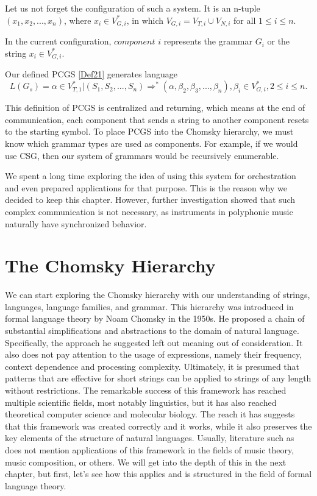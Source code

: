 \begin{definition}
\label{Def23}
Let us not forget the configuration of such a system. It is an n-tuple $(x_1, x_2, ..., x_n)$, where $x_i \in V^*_{G,i}$, in which $V_{G,i} = V_{T,i} \cup V_{N,i}$ for all $1 \leq i \leq n$.
\end{definition}

In the current configuration, $component$ $i$ represents the grammar $G_i$ or the string $x_i \in V^*_{G, i}$.

\begin{definition}
\label{Def24}
Our defined PCGS \ref{Def21} generates language $$L(G_s) = {\alpha \in V^*_{T, 1} | (S_1, S_2, ..., S_n) \Rightarrow^* (\alpha, \beta_2, \beta_3, ..., \beta_n), \beta_i \in V^*_{G,i}, 2 \leq i \leq n}.$$ 
\end{definition}

This definition of PCGS is centralized and returning, which means at the end of communication, each component that sends a string to another component resets to the starting symbol. To place PCGS into the Chomsky hierarchy, we must know which grammar types are used as components. For example, if we would use CSG, then our system of grammars would be recursively enumerable.

We spent a long time exploring the idea of using this system for orchestration and even prepared applications for that purpose. This is the reason why we decided to keep this chapter. However, further investigation showed that such complex communication is not necessary, as instruments in polyphonic music naturally have synchronized behavior.


\section{The Chomsky Hierarchy}
\label{sec:chomhierarchy}
We can start exploring the Chomsky hierarchy with our understanding of strings, languages, language families, and grammar. This hierarchy was introduced in formal language theory by Noam Chomsky in the 1950s. He proposed a chain of substantial simplifications and abstractions to the domain of natural language. Specifically, the approach he suggested left out meaning out of consideration. It also does not pay attention to the usage of expressions, namely their frequency, context dependence and processing complexity. Ultimately, it is presumed that patterns that are effective for short strings can be applied to strings of any length without restrictions. The remarkable success of this framework has reached multiple scientific fields, most notably linguistics, but it has also reached theoretical computer science and molecular biology. The reach it has suggests that this framework was created correctly and it works, while it also preserves the key elements of the structure of natural languages. Usually, literature such as \cite{FormalLanguageTheory} does not mention applications of this framework in the fields of music theory, music composition, or others. We will get into the depth of this in the next chapter, but first, let's see how this applies and is structured in the field of formal language theory.

